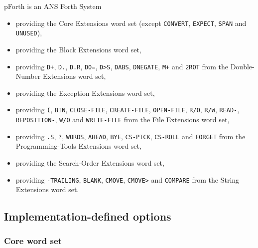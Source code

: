 \documentclass[english]{article}
\begin{document}
pForth is an ANS Forth System
\vspace{-3mm}
\begin{itemize}
\item[]providing the Core Extensions word set (except {\tt CONVERT}, {\tt EXPECT}, {\tt SPAN} and {\tt UNUSED}),
\item[]providing the Block Extensions word set,
\item[]providing {\tt D+}, {\tt D.}, {\tt D.R}, {\tt D0=}, {\tt D>S}, {\tt DABS}, {\tt DNEGATE}, {\tt M+} and {\tt 2ROT} from the Double-Number Extensions word set,
\item[]providing the Exception Extensions word set,
\item[]providing {\tt (}, {\tt BIN}, {\tt CLOSE-FILE}, {\tt CREATE-FILE}, {\tt OPEN-FILE}, {\tt R/O}, {\tt R/W}, {\tt READ-}, {\tt REPOSITION-}, {\tt W/O} and {\tt WRITE-FILE} from the File Extensions word set,
\item[]providing {\tt .S}, {\tt ?}, {\tt WORDS}, {\tt AHEAD}, {\tt BYE}, {\tt CS-PICK}, {\tt CS-ROLL} and {\tt FORGET} from the Programming-Tools Extensions word set,
\item[]providing the Search-Order Extensions word set,
\item[]providing {\tt -TRAILING}, {\tt BLANK}, {\tt CMOVE}, {\tt CMOVE>} and {\tt COMPARE} from the String Extensions word set.
\end{itemize}


\subsection{Implementation-defined options}

\subsubsection{Core word set}
\end{document}

